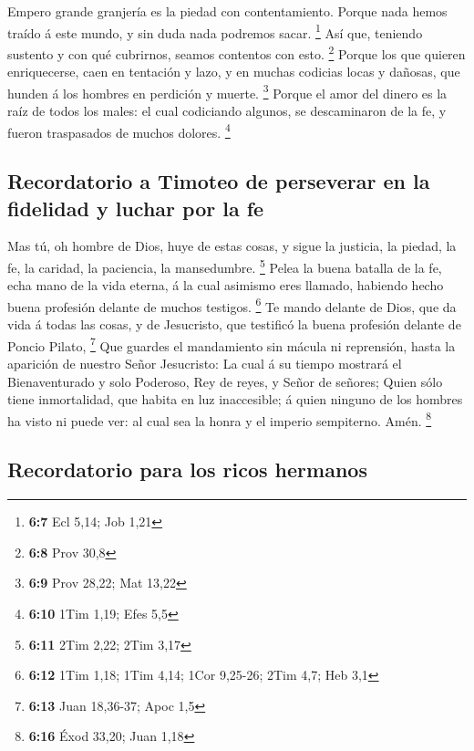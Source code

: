  Empero grande granjería es la piedad con contentamiento.
 Porque nada hemos traído á este mundo, y sin duda nada
podremos sacar. \footnote{\textbf{6:7} Ecl 5,14; Job 1,21}
 Así que, teniendo sustento y con qué cubrirnos, seamos
contentos con esto. \footnote{\textbf{6:8} Prov 30,8} 
Porque los que quieren enriquecerse, caen en tentación y lazo, y en
muchas codicias locas y dañosas, que hunden á los hombres en perdición y
muerte. \footnote{\textbf{6:9} Prov 28,22; Mat 13,22} 
Porque el amor del dinero es la raíz de todos los males: el cual
codiciando algunos, se descaminaron de la fe, y fueron traspasados de
muchos dolores. \footnote{\textbf{6:10} 1Tim 1,19; Efes 5,5}

\hypertarget{recordatorio-a-timoteo-de-perseverar-en-la-fidelidad-y-luchar-por-la-fe}{%
\subsection{Recordatorio a Timoteo de perseverar en la fidelidad y
luchar por la
fe}\label{recordatorio-a-timoteo-de-perseverar-en-la-fidelidad-y-luchar-por-la-fe}}

 Mas tú, oh hombre de Dios, huye de estas cosas, y sigue
la justicia, la piedad, la fe, la caridad, la paciencia, la mansedumbre.
\footnote{\textbf{6:11} 2Tim 2,22; 2Tim 3,17}  Pelea la
buena batalla de la fe, echa mano de la vida eterna, á la cual asimismo
eres llamado, habiendo hecho buena profesión delante de muchos testigos.
\footnote{\textbf{6:12} 1Tim 1,18; 1Tim 4,14; 1Cor 9,25-26; 2Tim 4,7;
  Heb 3,1}  Te mando delante de Dios, que da vida á todas
las cosas, y de Jesucristo, que testificó la buena profesión delante de
Poncio Pilato, \footnote{\textbf{6:13} Juan 18,36-37; Apoc 1,5}
 Que guardes el mandamiento sin mácula ni reprensión,
hasta la aparición de nuestro Señor Jesucristo:  La cual
á su tiempo mostrará el Bienaventurado y solo Poderoso, Rey de reyes, y
Señor de señores;  Quien sólo tiene inmortalidad, que
habita en luz inaccesible; á quien ninguno de los hombres ha visto ni
puede ver: al cual sea la honra y el imperio sempiterno. Amén.
\footnote{\textbf{6:16} Éxod 33,20; Juan 1,18}

\hypertarget{recordatorio-para-los-ricos-hermanos}{%
\subsection{Recordatorio para los ricos
hermanos}\label{recordatorio-para-los-ricos-hermanos}}

